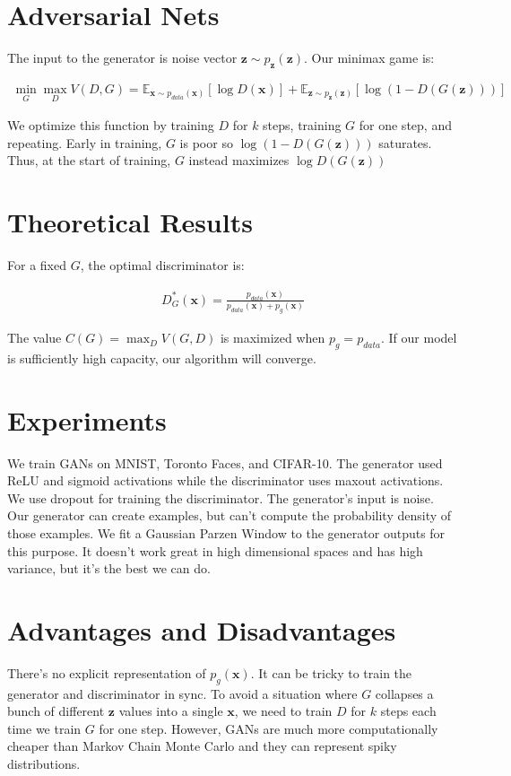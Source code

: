 \documentclass[a4paper]{article}
\begin{document}
\section{Adversarial Nets}
The input to the generator is noise vector $\bm{z} \sim p_{\bm{z}}(\bm{z})$.
Our minimax game is:

\begin{align}
  \min_{G}{\max_{D}{
    V(D, G) = \mathbb{E}_{\bm{x} \sim p_{data}(\bm{x})}[\log{D(\bm{x})}]
    + \mathbb{E}_{\bm{z} \sim p_{\bm{z}}(\bm{z})}[
    \log{(1 - D(G(\bm{z})))}
    ]
  }}
\end{align}

We optimize this function by training $D$ for $k$ steps, training $G$ for one
step, and repeating. Early in training, $G$ is poor so
$\log{(1 - D(G(\bm{z})))}$ saturates. Thus, at the start of training, $G$
instead maximizes $\log{D(G(\bm{z}))}$

\section{Theoretical Results}
For a fixed $G$, the optimal discriminator is:

\begin{align}
  D^*_{G}(\bm{x}) = \frac{p_{data}(\bm{x})}{p_{data}(\bm{x}) + p_g(\bm{x})}
\end{align}

The value $C(G) = \max_{D}{V(G, D)}$ is maximized when $p_g = p_{data}$. If our
model is sufficiently high capacity, our algorithm will converge.

\section{Experiments}
We train GANs on MNIST, Toronto Faces, and CIFAR-10. The generator used
ReLU and sigmoid activations while the discriminator uses maxout activations.
We use dropout for training the discriminator. The generator's input is noise.
Our generator can create examples, but can't compute the probability density of
those examples. We fit a Gaussian Parzen Window to the generator outputs for
this purpose. It doesn't work great in high dimensional spaces and has high
variance, but it's the best we can do.

\section{Advantages and Disadvantages}
There's no explicit representation of $p_g(\bm{x})$. It can be tricky to train
the generator and discriminator in sync. To avoid a situation where $G$
collapses a bunch of different $\bm{z}$ values into a single $\bm{x}$, we need
to train $D$ for $k$ steps each time we train $G$ for one step. However,
GANs are much more computationally cheaper than Markov Chain Monte Carlo and
they can represent spiky distributions.
\end{document}
